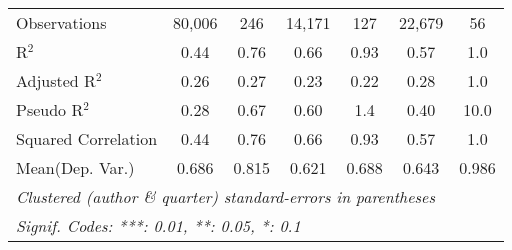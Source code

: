\begin{tabular}{lcccccc}
   Observations                                               & 80,006       & 246           & 14,171  & 127     & 22,679      & 56\\  
   R$^2$                                                      & 0.44         & 0.76          & 0.66    & 0.93    & 0.57        & 1.0\\  
   Adjusted R$^2$                                             & 0.26         & 0.27          & 0.23    & 0.22    & 0.28        & 1.0\\  
   Pseudo R$^2$                                               & 0.28         & 0.67          & 0.60    & 1.4     & 0.40        & 10.0\\  
   Squared Correlation                                        & 0.44         & 0.76          & 0.66    & 0.93    & 0.57        & 1.0\\  
Mean(Dep. Var.) & 0.686 & 0.815 & 0.621 & 0.688 & 0.643 & 0.986 \\
   \midrule \midrule
   \multicolumn{7}{l}{\emph{Clustered (author \& quarter) standard-errors in parentheses}}\\
   \multicolumn{7}{l}{\emph{Signif. Codes: ***: 0.01, **: 0.05, *: 0.1}}\\
\end{tabular}
\par\endgroup
